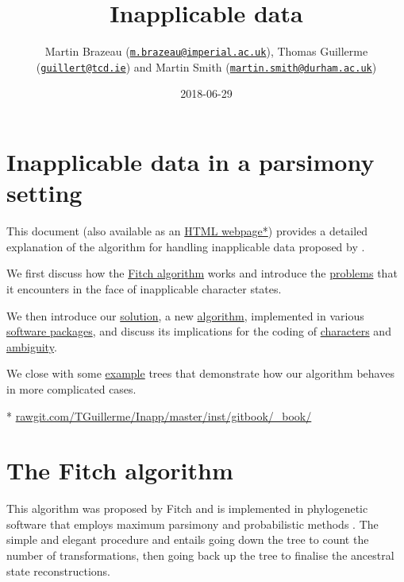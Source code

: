 \documentclass[]{book}
\title{Inapplicable data}
\author{Martin Brazeau
(\href{mailto:m.brazeau@imperial.ac.uk}{\nolinkurl{m.brazeau@imperial.ac.uk}}),
Thomas Guillerme
(\href{mailto:guillert@tcd.ie}{\nolinkurl{guillert@tcd.ie}}) and Martin
Smith
(\href{mailto:martin.smith@durham.ac.uk}{\nolinkurl{martin.smith@durham.ac.uk}})}
\date{2018-06-29}
\theoremstyle{definition}
\theoremstyle{definition}
\theoremstyle{definition}
\theoremstyle{remark}
\begin{document}
\maketitle

{
\setcounter{tocdepth}{1}
\tableofcontents
}
\hypertarget{inapplicable-data-in-a-parsimony-setting}{%
\chapter*{Inapplicable data in a parsimony
setting}\label{inapplicable-data-in-a-parsimony-setting}}

This document (also available as an
\href{https://rawgit.com/TGuillerme/Inapp/master/inst/gitbook/_book/index.html}{HTML
webpage*}) provides a detailed explanation of the algorithm for handling
inapplicable data proposed by \citet{Brazeau2018}.

We first discuss how the \protect\hyperlink{fitch}{Fitch algorithm}
works and introduce the \protect\hyperlink{problems}{problems} that it
encounters in the face of inapplicable character states.

We then introduce our \protect\hyperlink{solution}{solution}, a new
\protect\hyperlink{algorithm}{algorithm}, implemented in various
\protect\hyperlink{software}{software packages}, and discuss its
implications for the coding of \protect\hyperlink{coding}{characters}
and \protect\hyperlink{ambiguity}{ambiguity}.

We close with some \protect\hyperlink{examples}{example} trees that
demonstrate how our algorithm behaves in more complicated cases.

*
\href{https://rawgit.com/TGuillerme/Inapp/master/inst/gitbook/_book/index.html}{rawgit.com/TGuillerme/Inapp/master/inst/gitbook/\_book/}

\hypertarget{fitch}{%
\chapter{The Fitch algorithm}\label{fitch}}

This algorithm was proposed by Fitch \citeyearpar{Fitch1971} and is
implemented in phylogenetic software that employs maximum parsimony
\citep{swofford2001paup, Goloboff2016} and probabilistic methods
\citep{Ronquist2012mrbayes, Stamatakis2014}. The simple and elegant
procedure and entails going down the tree to count the number of
transformations, then going back up the tree to finalise the ancestral
state reconstructions.
\end{document}
